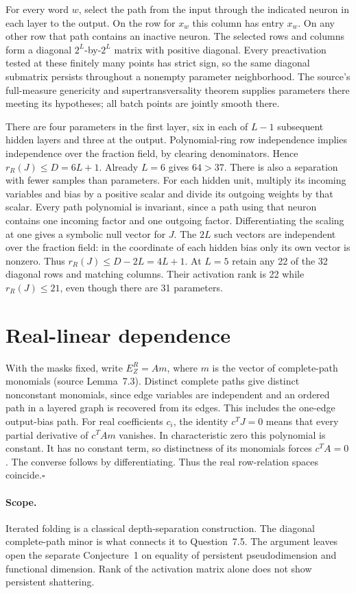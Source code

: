 \documentclass[11pt]{article}
\begin{document}
For every word $w$, select the path from the input through the indicated neuron in each layer to the output. On the row for $x_w$ this column has entry $x_w$. On any other row that path contains an inactive neuron. The selected rows and columns form a diagonal $2^L$-by-$2^L$ matrix with positive diagonal. Every preactivation tested at these finitely many points has strict sign, so the same diagonal submatrix persists throughout a nonempty parameter neighborhood. The source's full-measure genericity and supertransversality theorem supplies parameters there meeting its hypotheses; all batch points are jointly smooth there.

There are four parameters in the first layer, six in each of $L-1$ subsequent hidden layers and three at the output. Polynomial-ring row independence implies independence over the fraction field, by clearing denominators. Hence $r_R(J)\le D=6L+1$. Already $L=6$ gives $64>37$. There is also a separation with fewer samples than parameters. For each hidden unit, multiply its incoming variables and bias by a positive scalar and divide its outgoing weights by that scalar. Every path polynomial is invariant, since a path using that neuron contains one incoming factor and one outgoing factor. Differentiating the scaling at one gives a symbolic null vector for $J$. The $2L$ such vectors are independent over the fraction field: in the coordinate of each hidden bias only its own vector is nonzero. Thus $r_R(J)\le D-2L=4L+1$. At $L=5$ retain any 22 of the 32 diagonal rows and matching columns. Their activation rank is 22 while $r_R(J)\le21$, even though there are 31 parameters.

\section*{Real-linear dependence}
With the masks fixed, write $E_Z^R=A m$, where $m$ is the vector of complete-path monomials (source Lemma~7.3). Distinct complete paths give distinct nonconstant monomials, since edge variables are independent and an ordered path in a layered graph is recovered from its edges. This includes the one-edge output-bias path. For real coefficients $c_i$, the identity $c^TJ=0$ means that every partial derivative of $c^TA m$ vanishes. In characteristic zero this polynomial is constant. It has no constant term, so distinctness of its monomials forces $c^TA=0$. The converse follows by differentiating. Thus the real row-relation spaces coincide.\hfill$\square$

\paragraph{Scope.} Iterated folding is a classical depth-separation construction. The diagonal complete-path minor is what connects it to Question~7.5. The argument leaves open the separate Conjecture~1 on equality of persistent pseudodimension and functional dimension. Rank of the activation matrix alone does not show persistent shattering.
\end{document}
